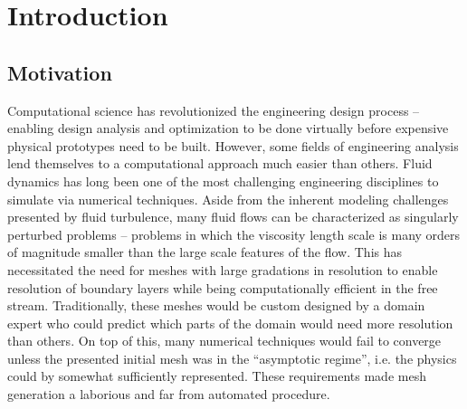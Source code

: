 \documentclass[Proposal.tex]{subfiles}
\begin{document}
\chapter{Introduction}
\section{Motivation} 

Computational science has revolutionized the engineering design process -- enabling design analysis
and optimization to be done virtually before expensive physical prototypes need to be built.
However, some fields of engineering analysis lend themselves to a computational approach much easier
than others. 
Fluid dynamics has long been one of the most challenging engineering disciplines to simulate via numerical techniques.
Aside from the inherent modeling challenges presented by fluid turbulence, many fluid flows can be characterized as singularly perturbed problems 
-- problems in which the viscosity length scale is many orders of magnitude smaller than the large scale features of the flow.
This has necessitated the need for meshes with large gradations in resolution to enable resolution of boundary layers while being computationally efficient in the free stream.
Traditionally, these meshes would be custom designed by a domain expert who could predict which parts of the domain would need more resolution than others. 
On top of this, many numerical techniques would fail to converge unless the presented initial mesh was in the ``asymptotic regime'', 
i.e. the physics could by somewhat sufficiently represented.
These requirements made mesh generation a laborious and far from automated procedure.
\end{document}
